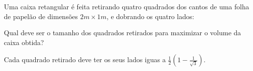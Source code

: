 \begin{exo}
Uma caixa retangular  é feita retirando quatro quadrados dos cantos de uma
folha de papelão de dimensões $2m\times1m$, e dobrando os quatro
lados:
\begin{center}
\newcommand{\bzzz}{0.3}
\begin{bmlimage}\end{bmlimage}
\end{center}
Qual deve ser o tamanho dos quadrados retirados para maximizar o
volume da caixa obtida?
\begin{sol}
Cada quadrado retirado deve ter os seus lados iguas a 
$\tfrac12(1-\frac{1}{\sqrt{3}})$.
\end{sol}
\end{exo}

